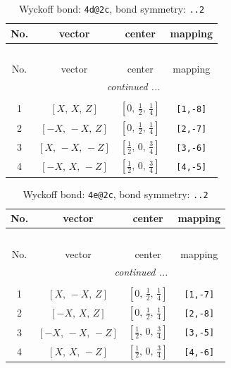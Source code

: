 \documentclass[fleqn,8pt]{jsarticle}
\begin{document}
\begin{longtable}{cccc}
\caption{Wyckoff bond: {\tt 4d@2c}, bond symmetry: {\tt ..2}}
 \\
 \hline \hline
No. & vector & center & mapping \\ \hline \endfirsthead

\multicolumn{3}{l}{\tablename\ \thetable{}} \\
 \hline \hline
No. & vector & center & mapping \\ \hline \endhead

 \hline \hline
\multicolumn{3}{r}{\footnotesize\it continued ...} \\ \endfoot

 \hline \hline
\multicolumn{3}{r}{} \\ \endlastfoot

1 & $\left[ X,\, X,\, Z \right]$ & $\left[ 0,\, \frac{1}{2},\, \frac{1}{4} \right]$ & {\tt [1,-8]} \\ \hline
2 & $\left[ - X,\, - X,\, Z \right]$ & $\left[ 0,\, \frac{1}{2},\, \frac{1}{4} \right]$ & {\tt [2,-7]} \\ \hline
3 & $\left[ X,\, - X,\, - Z \right]$ & $\left[ \frac{1}{2},\, 0,\, \frac{3}{4} \right]$ & {\tt [3,-6]} \\ \hline
4 & $\left[ - X,\, X,\, - Z \right]$ & $\left[ \frac{1}{2},\, 0,\, \frac{3}{4} \right]$ & {\tt [4,-5]} \\
\end{longtable}
\renewcommand{\arraystretch}{1.2}
\begin{longtable}{cccc}
\caption{Wyckoff bond: {\tt 4e@2c}, bond symmetry: {\tt ..2}}
 \\
 \hline \hline
No. & vector & center & mapping \\ \hline \endfirsthead

\multicolumn{3}{l}{\tablename\ \thetable{}} \\
 \hline \hline
No. & vector & center & mapping \\ \hline \endhead

 \hline \hline
\multicolumn{3}{r}{\footnotesize\it continued ...} \\ \endfoot

 \hline \hline
\multicolumn{3}{r}{} \\ \endlastfoot

1 & $\left[ X,\, - X,\, Z \right]$ & $\left[ 0,\, \frac{1}{2},\, \frac{1}{4} \right]$ & {\tt [1,-7]} \\ \hline
2 & $\left[ - X,\, X,\, Z \right]$ & $\left[ 0,\, \frac{1}{2},\, \frac{1}{4} \right]$ & {\tt [2,-8]} \\ \hline
3 & $\left[ - X,\, - X,\, - Z \right]$ & $\left[ \frac{1}{2},\, 0,\, \frac{3}{4} \right]$ & {\tt [3,-5]} \\ \hline
4 & $\left[ X,\, X,\, - Z \right]$ & $\left[ \frac{1}{2},\, 0,\, \frac{3}{4} \right]$ & {\tt [4,-6]} \\
\end{longtable}
\end{document}

